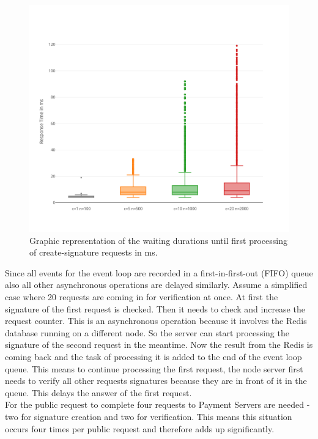 \documentclass[a4paper,12pt]{scrartcl}
\begin{document}
\begin{figure}[H]
\centering
\includegraphics[width=350pt]{Images/CreateSignatureWaitDurationsDiagram.png}
\caption{Graphic representation of the waiting durations until first processing of create-signature requests in ms.}
\label{fig:CreateSignatureWaitDurationsDiagram}
\end{figure}

Since all events for the event loop are recorded in a first-in-first-out (FIFO) queue also all other asynchronous operations are delayed similarly. Assume a simplified case where 20 requests are coming in for verification at once. At first the signature of the first request is checked. Then it needs to check and increase the request counter. This is an asynchronous operation because it involves the Redis database running on a different node. So the server can start processing the signature of the second request in the meantime. Now the result from the Redis is coming back and the task of processing it is added to the end of the event loop queue. This means to continue processing the first request, the node server first needs to verify all other requests signatures because they are in front of it in the queue. This delays the answer of the first request.\\

For the public request to complete four requests to Payment Servers are needed - two for signature creation and two for verification. This means this situation occurs four times per public request and therefore adds up significantly.\\
\end{document}
